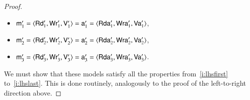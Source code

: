\documentclass{llncs}
\newcommand{\modl}{\mathsf m}
\newcommand{\readset}{\mathsf{Rd}}
\newcommand{\valuset}{\mathsf{V}}
\newcommand{\writeset}{\mathsf{Wr}}
\newcommand{\tuple}[1]{ \langle #1 \rangle}
\begin{document}
\begin{proof}
\begin{itemize}
\item $\modl'_1 = \tuple{\readset'_1, \writeset'_1, \valuset'_1} = \modla'_1 = \tuple{\readseta'_1, \writeseta'_1, \valuseta'_1}$,
\item $\modl'_2 = \tuple{\readset'_2, \writeset'_2, \valuset'_2} = \modla'_2 = \tuple{\readseta'_2, \writeseta'_2, \valuseta'_2}$,
\item $\modl'_3 = \tuple{\readset'_3, \writeset'_3, \valuset'_3} = \modla'_3 = \tuple{\readseta'_3, \writeseta'_3, \valuseta'_3}$. 
\end{itemize}

We must show that these models satisfy all the properties from~\ref{i:lhsfirst} to~\ref{i:lhslast}. This is done routinely, analogously to the proof of the left-to-right direction above.
\end{proof}




%


\end{document}
